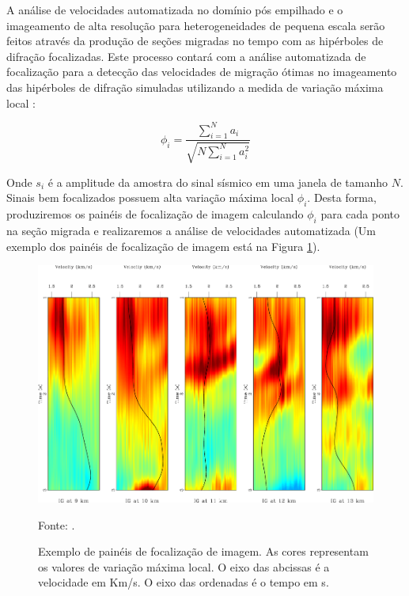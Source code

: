 A análise de velocidades automatizada no domínio pós empilhado e o imageamento de alta resolução
para heterogeneidades de pequena escala serão feitos através da produção de seções migradas no tempo 
com as hipérboles de difração focalizadas. 
Este processo contará com a análise automatizada de focalização para a detecção das
velocidades de migração ótimas no imageamento das hipérboles de difração simuladas 
utilizando a medida de variação máxima local \cite{sep_dif}:

\begin{equation}
 \label{eq:8.2}
 \phi_i = \frac{\sum^N_{i=1} a_i }{\sqrt{ N \sum^N_{i=1} a_i^2 }} 
\end{equation}

Onde $s_i$ é a amplitude da amostra do sinal sísmico em uma janela de tamanho $N$.
Sinais bem focalizados possuem alta variação máxima local $\phi_i$. Desta forma, produziremos
os painéis de focalização de imagem calculando $\phi_i$ para cada ponto na seção migrada
e realizaremos a análise de velocidades automatizada (Um exemplo dos painéis de focalização de imagem
está na Figura \ref{fig:8.4}).

\begin{figure}[htb]
\caption{Exemplo de painéis de focalização de imagem. As cores representam os valores de variação
máxima local. O eixo das abcissas é a velocidade em Km/s. O eixo das ordenadas é o tempo em s.}
\begin{center}
\includegraphics[scale=0.30]{images/panelfig.png}
\vspace{-0.3cm}
\end{center}
\begin{center}
 Fonte: \cite{sep_dif}.
\end{center}
\label{fig:8.4}
\end{figure}

